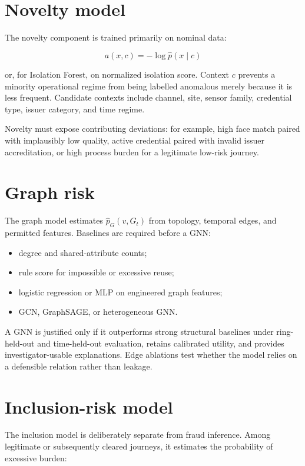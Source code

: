 \section{Novelty model}

The novelty component is trained primarily on nominal data:

\begin{equation}
a(x,c)=-\log \hat{p}(x\mid c)
\end{equation}

or, for Isolation Forest, on normalized isolation score. Context $c$ prevents a minority operational regime from being labelled anomalous merely because it is less frequent. Candidate contexts include channel, site, sensor family, credential type, issuer category, and time regime.

Novelty must expose contributing deviations: for example, high face match paired with implausibly low quality, active credential paired with invalid issuer accreditation, or high process burden for a legitimate low-risk journey.

\section{Graph risk}

The graph model estimates $\hat{p}_G(v,G_t)$ from topology, temporal edges, and permitted features. Baselines are required before a GNN:

\begin{itemize}
\item degree and shared-attribute counts;
\item rule score for impossible or excessive reuse;
\item logistic regression or MLP on engineered graph features;
\item GCN, GraphSAGE, or heterogeneous GNN.
\end{itemize}

A GNN is justified only if it outperforms strong structural baselines under ring-held-out and time-held-out evaluation, retains calibrated utility, and provides investigator-usable explanations. Edge ablations test whether the model relies on a defensible relation rather than leakage.

\section{Inclusion-risk model}

The inclusion model is deliberately separate from fraud inference. Among legitimate or subsequently cleared journeys, it estimates the probability of excessive burden:

